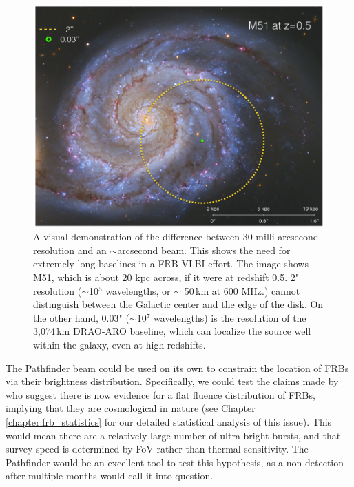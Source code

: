 \begin{figure}[!h]
\label{fig-m51}
\begin{center}
\includegraphics[trim={0in, 0in, 0in, 0in}, width=\textwidth]{./figures/beamforming/m51green.jpeg}
\caption[abc]{A visual demonstration of the difference between 
     30 milli-arcsecond resolution and an $\sim$arcsecond beam.
     This shows the need for extremely long baselines 
     in a FRB VLBI effort.
     The image shows M51, which is about 20 kpc across, if it
     were at redshift 0.5. 2" resolution ($\sim$10$^5$ wavelengths, or $\sim$
     50\,km at 600 MHz.) cannot distinguish between the 
     Galactic center and the edge of the disk. On the other hand,
     0.03" ($\sim$10$^7$ wavelengths)
     is the resolution of the 3,074\,km DRAO-ARO baseline,  
     which can localize the source well within the galaxy, even at 
     high redshifts.}  
\end{center}
\end{figure}

The Pathfinder beam could be used on its own to constrain 
the location of FRBs via their brightness distribution.
Specifically, we could test the claims made by
\citet{2016arXiv160606795V} who suggest there is now evidence 
for a flat fluence distribution of FRBs, implying 
that they are cosmological in nature 
(see Chapter \ref{chapter:frb_statistics} for our detailed statistical
analysis of this issue). 
This would mean there are a relatively large number of 
ultra-bright bursts, 
and that survey speed is determined by FoV rather than 
thermal sensitivity. The Pathfinder would be an excellent 
tool to test this hypothesis, as a non-detection after multiple months 
would call it into question. 


